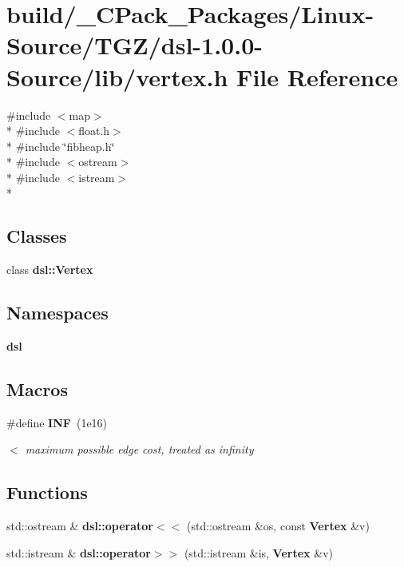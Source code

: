 \section{build/\-\_\-\-C\-Pack\-\_\-\-Packages/\-Linux-\/\-Source/\-T\-G\-Z/dsl-\/1.0.0-\/\-Source/lib/vertex.h File Reference}
\label{build_2__CPack__Packages_2Linux-Source_2TGZ_2dsl-1_80_80-Source_2lib_2vertex_8h}
{\ttfamily \#include $<$map$>$}\\*
{\ttfamily \#include $<$float.\-h$>$}\\*
{\ttfamily \#include \char`\"{}fibheap.\-h\char`\"{}}\\*
{\ttfamily \#include $<$ostream$>$}\\*
{\ttfamily \#include $<$istream$>$}\\*
\subsection*{Classes}
\begin{DoxyCompactItemize}
\item 
class {\bf dsl\-::\-Vertex}
\end{DoxyCompactItemize}
\subsection*{Namespaces}
\begin{DoxyCompactItemize}
\item 
{\bf dsl}
\end{DoxyCompactItemize}
\subsection*{Macros}
\begin{DoxyCompactItemize}
\item 
\#define {\bf I\-N\-F}~(1e16)
\begin{DoxyCompactList}\small\item\em $<$ maximum possible edge cost, treated as infinity \end{DoxyCompactList}\end{DoxyCompactItemize}
\subsection*{Functions}
\begin{DoxyCompactItemize}
\item 
std\-::ostream \& {\bf dsl\-::operator$<$$<$} (std\-::ostream \&os, const {\bf Vertex} \&v)
\item 
std\-::istream \& {\bf dsl\-::operator$>$$>$} (std\-::istream \&is, {\bf Vertex} \&v)
\end{DoxyCompactItemize}



